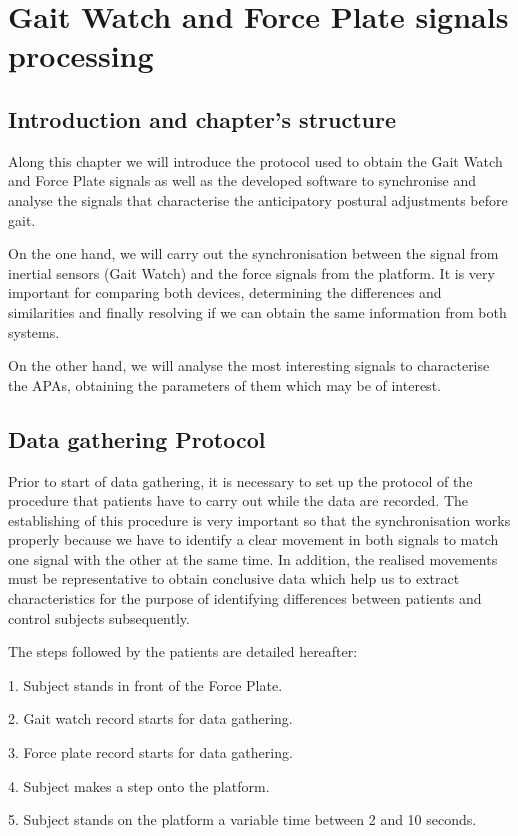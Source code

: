 \chapter{Gait Watch and Force Plate signals processing}
\label{ch:GWandFP}

\section{Introduction and chapter's structure}
Along this chapter we will introduce the protocol used to obtain the Gait Watch and Force Plate signals as well as the developed software to synchronise and analyse the signals that characterise the anticipatory postural adjustments before gait.

On the one hand, we will carry out the synchronisation between the signal from inertial sensors (Gait Watch) and the force signals from the platform. It is very important for comparing both devices, determining the differences and similarities and finally resolving if we can obtain the same information from both systems.

On the other hand, we will analyse the most interesting signals to characterise the APAs, obtaining the parameters of them which may be of interest.


\section{Data gathering Protocol}
Prior to start of data gathering, it is necessary to set up the protocol of the procedure that patients have to carry out while the data are recorded. The establishing of this procedure is very important so that the synchronisation works properly because we have to identify a clear movement in both signals to match one signal with the other at the same time.
In addition, the realised movements must be representative to obtain conclusive data which help us to extract characteristics for the purpose of identifying differences between patients and control subjects subsequently.

The steps followed by the patients are detailed hereafter:

1.	Subject stands in front of the Force Plate.

2.	Gait watch record starts for data gathering.

3.	Force plate record starts for data gathering.

4.	Subject makes a step onto the platform.

5.	Subject stands on the platform a variable time between 2 and 10 seconds.

